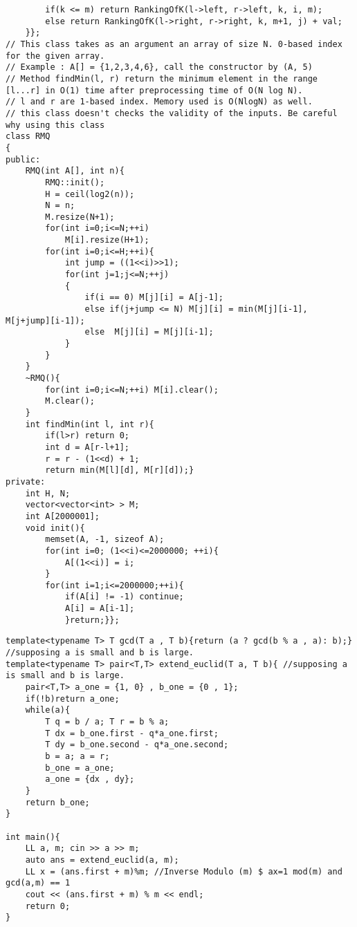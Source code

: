 \documentclass[10pt,a4paper]{report}
\begin{document}
\begin{landscape}
\begin{multicols}{2}
\begin{verbatim}
		if(k <= m) return RankingOfK(l->left, r->left, k, i, m);
		else return RankingOfK(l->right, r->right, k, m+1, j) + val;
	}};
// This class takes as an argument an array of size N. 0-based index for the given array. 
// Example : A[] = {1,2,3,4,6}, call the constructor by (A, 5)
// Method findMin(l, r) return the minimum element in the range [l...r] in O(1) time after preprocessing time of O(N log N).
// l and r are 1-based index. Memory used is O(NlogN) as well.
// this class doesn't checks the validity of the inputs. Be careful why using this class
class RMQ
{
public:
	RMQ(int A[], int n){
		RMQ::init();
		H = ceil(log2(n));
		N = n;
		M.resize(N+1);
		for(int i=0;i<=N;++i)
			M[i].resize(H+1);
		for(int i=0;i<=H;++i){
			int jump = ((1<<i)>>1);
			for(int j=1;j<=N;++j)
			{
				if(i == 0) M[j][i] = A[j-1];
				else if(j+jump <= N) M[j][i] = min(M[j][i-1], M[j+jump][i-1]);
				else  M[j][i] = M[j][i-1];
			}
		}
	}
	~RMQ(){
		for(int i=0;i<=N;++i) M[i].clear();
		M.clear();
	}
	int findMin(int l, int r){
		if(l>r) return 0;
		int d = A[r-l+1];
		r = r - (1<<d) + 1;
		return min(M[l][d], M[r][d]);}
private:
	int H, N;
	vector<vector<int> > M;
	int A[2000001];
	void init(){
		memset(A, -1, sizeof A);
		for(int i=0; (1<<i)<=2000000; ++i){
			A[(1<<i)] = i;
		}
		for(int i=1;i<=2000000;++i){
			if(A[i] != -1) continue;
			A[i] = A[i-1];
			}return;}};
\end{verbatim}

\begin{verbatim}		
template<typename T> T gcd(T a , T b){return (a ? gcd(b % a , a): b);} //supposing a is small and b is large.
template<typename T> pair<T,T> extend_euclid(T a, T b){ //supposing a is small and b is large.
	pair<T,T> a_one = {1, 0} , b_one = {0 , 1}; 
	if(!b)return a_one;
	while(a){
		T q = b / a; T r = b % a;
		T dx = b_one.first - q*a_one.first; 
		T dy = b_one.second - q*a_one.second; 
		b = a; a = r;
		b_one = a_one; 
		a_one = {dx , dy}; 
	}
	return b_one;   
}

int main(){
	LL a, m; cin >> a >> m;
	auto ans = extend_euclid(a, m); 
	LL x = (ans.first + m)%m; //Inverse Modulo (m) $ ax=1 mod(m) and gcd(a,m) == 1
	cout << (ans.first + m) % m << endl; 
	return 0; 
}
\end{verbatim}
\end{multicols}
\end{landscape}
\end{document}
